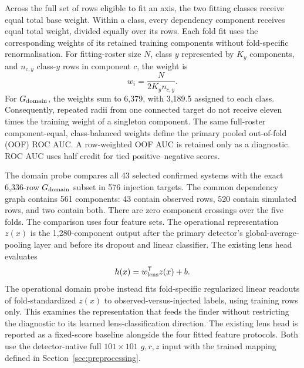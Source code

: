 Across the full set of rows eligible to fit an axis, the two fitting classes
receive equal total base weight. Within a class, every dependency component receives equal total
weight, divided equally over its rows. Each fold fit uses the corresponding
weights of its retained training components without fold-specific
renormalisation. For fitting-roster size \(N\), class \(y\) represented by
\(K_y\) components, and \(n_{c,y}\) class-\(y\) rows in component \(c\), the
weight is
\begin{equation}
 w_i=\frac{N}{2K_y n_{c,y}}.
\label{eq:probe_weights}
\end{equation}
For \(G_{\rm domain}\), the weights sum to 6,379, with 3,189.5 assigned to
each class. Consequently, repeated radii from one connected target do
not receive eleven times the training weight of a singleton component. The
same full-roster component-equal, class-balanced weights define the primary
pooled out-of-fold (OOF) ROC AUC. A row-weighted OOF AUC is retained only as
a diagnostic.
ROC AUC uses half credit for tied positive--negative scores.

The domain probe compares all 43 selected confirmed systems with the exact
6,336-row \(G_{\rm domain}\) subset in 576 injection targets. The common
dependency graph contains 561 components: 43 contain observed rows, 520
contain simulated rows, and two contain both. There are zero component
crossings over the five folds. The comparison uses four feature sets. The
operational representation \(z(x)\) is the 1,280-component output after the
primary detector's global-average-pooling layer and before its dropout and
linear classifier. The existing lens head evaluates
\begin{equation}
 h(x)=w_{\rm lens}^{\mathsf T}z(x)+b .
\label{eq:fixed_head}
\end{equation}
The operational domain probe instead fits fold-specific regularized linear
readouts of fold-standardized \(z(x)\) to observed-versus-injected labels,
using training rows only. This examines the representation that feeds the
finder without restricting the diagnostic to its learned lens-classification
direction. The existing lens head is reported as a fixed-score baseline
alongside the four fitted feature protocols. Both use the
detector-native full \(101\times101\) \(g,r,z\) input with the trained mapping
defined in Section~\ref{sec:preprocessing}.

